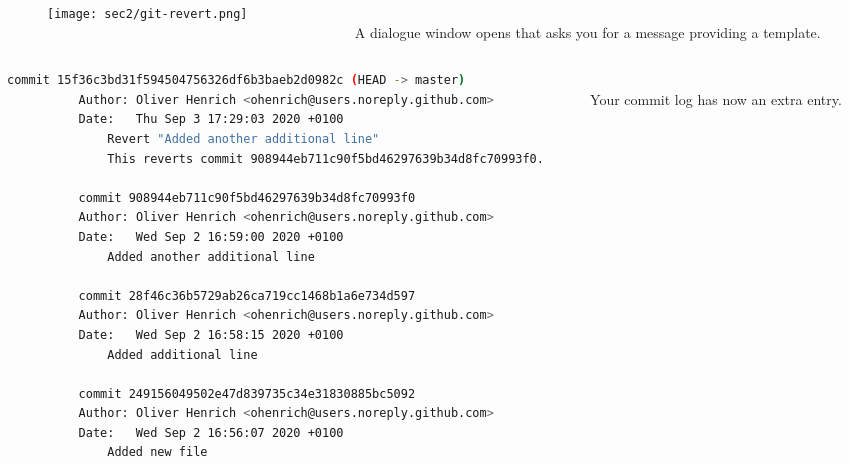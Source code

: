 \begin{frame}[fragile]
\emptyframetitle

\vspace*{-0.75cm}
  \begin{columns}
    \begin{column}{0.55\textwidth}
      \begin{figure}[h]
        \texttt{[image: sec2/git-revert.png]}
      \end{figure}

    \end{column}

   \begin{column}{0.45\textwidth}
      \vspace*{0.5cm}\\
      A dialogue window opens that asks you for a message providing a template.
    \end{column}
  \end{columns}

\vspace*{-0.2cm}
  \begin{columns}
    \begin{column}{0.7\textwidth}

      \begin{block}{}
        \begin{lstlisting}[language=bash, basicstyle=\tiny\ttfamily]
          commit 15f36c3bd31f594504756326df6b3baeb2d0982c (HEAD -> master)
          Author: Oliver Henrich <ohenrich@users.noreply.github.com>
          Date:   Thu Sep 3 17:29:03 2020 +0100
              Revert "Added another additional line"
              This reverts commit 908944eb711c90f5bd46297639b34d8fc70993f0.

          commit 908944eb711c90f5bd46297639b34d8fc70993f0
          Author: Oliver Henrich <ohenrich@users.noreply.github.com>
          Date:   Wed Sep 2 16:59:00 2020 +0100
              Added another additional line

          commit 28f46c36b5729ab26ca719cc1468b1a6e734d597
          Author: Oliver Henrich <ohenrich@users.noreply.github.com>
          Date:   Wed Sep 2 16:58:15 2020 +0100
              Added additional line

          commit 249156049502e47d839735c34e31830885bc5092
          Author: Oliver Henrich <ohenrich@users.noreply.github.com>
          Date:   Wed Sep 2 16:56:07 2020 +0100
              Added new file
        \end{lstlisting}
      \end{block}
    \end{column}

     \begin{column}{0.25\textwidth}
        \vspace*{0.5cm}\\
        Your commit log has now an extra entry.
    \end{column}
  \end{columns}


\end{frame}


